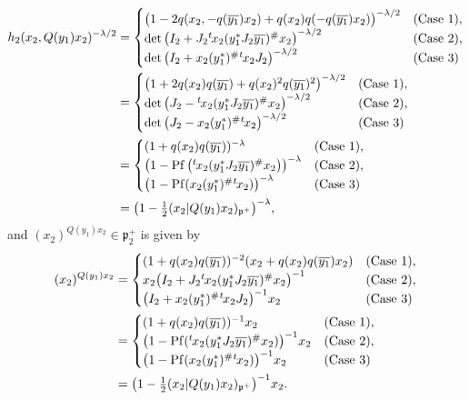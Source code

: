 \documentclass[pdftex]{sigma}
\numberwithin{equation}{section}
\newcommand{\fp}{\mathfrak{p}}
\newcommand{\Pf}{\operatorname{Pf}}
\begin{document}
\begin{align*}
h_2(x_2,Q(y_1)x_2)^{-\lambda/2}&=\begin{cases}
\big(1-2q(x_2,-q(\overline{y_1})x_2)+q(x_2)q(-q(\overline{y_1})x_2)\big)^{-\lambda/2} & (\text{Case }1),\\
\det\big(I_2+J_2{}^t\hspace{-1pt}x_2(y_1^*J_2\overline{y_1})^\#x_2\big)^{-\lambda/2} & (\text{Case }2),\\
\det\big(I_2+x_2(y_1^*)^\#{}^t\hspace{-1pt}x_2J_2\big)^{-\lambda/2} & (\text{Case }3) \end{cases}\\
&=\begin{cases}
\big(1+2q(x_2)q(\overline{y_1})+q(x_2)^2q(\overline{y_1})^2\big)^{-\lambda/2} & (\text{Case }1),\\
\det\big(J_2-{}^t\hspace{-1pt}x_2(y_1^*J_2\overline{y_1})^\#x_2\big)^{-\lambda/2} & (\text{Case }2),\\
\det\big(J_2-x_2(y_1^*)^\#{}^t\hspace{-1pt}x_2\big)^{-\lambda/2} & (\text{Case }3) \end{cases}\\
&=\begin{cases}
 (1+q(x_2)q(\overline{y_1}) )^{-\lambda} & (\text{Case }1),\\
\big(1-\Pf\big({}^t\hspace{-1pt}x_2(y_1^*J_2\overline{y_1})^\#x_2\big)\big)^{-\lambda} & (\text{Case }2),\\
\left(1-\Pf(x_2(y_1^*)^\#{}^t\hspace{-1pt}x_2)\right)^{-\lambda} & (\text{Case }3) \end{cases}\\
&=\big(1-\tfrac{1}{2}(x_2|Q(y_1)x_2)_{\fp^+}\big)^{-\lambda},
\end{align*}
and $(x_2)^{Q(y_1)x_2}\in\fp^+_2$ is given by
\begin{align*}
(x_2)^{Q(y_1)x_2}&=\begin{cases}
 (1+q(x_2)q(\overline{y_1}) )^{-2} (x_2+q(x_2)q(\overline{y_1})x_2 ) & (\text{Case }1),\\
x_2\big(I_2+J_2{}^t\hspace{-1pt}x_2(y_1^*J_2\overline{y_1})^\#x_2\big)^{-1} & (\text{Case }2),\\
\big(I_2+x_2(y_1^*)^\#{}^t\hspace{-1pt}x_2J_2\big)^{-1}x_2 & (\text{Case }3) \end{cases}\\
&=\begin{cases}
 (1+q(x_2)q(\overline{y_1}) )^{-1}x_2 & (\text{Case }1),\\
\big(1-\Pf({}^t\hspace{-1pt}x_2(y_1^*J_2\overline{y_1})^\#x_2)\big)^{-1}x_2 & (\text{Case }2),\\
\big(1-\Pf(x_2(y_1^*)^\#{}^t\hspace{-1pt}x_2)\big)^{-1}x_2 & (\text{Case }3) \end{cases}\\
&=\big(1-\tfrac{1}{2}(x_2|Q(y_1)x_2)_{\fp^+}\big)^{-1}x_2.
\end{align*}
\end{document}
